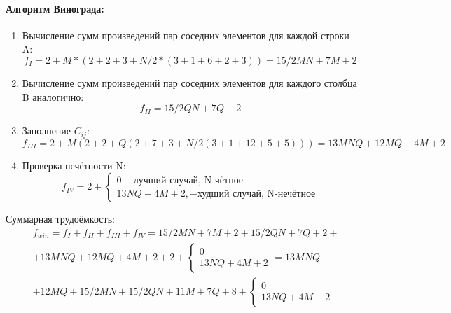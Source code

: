 \paragraph{Алгоритм Винограда:}
\begin{enumerate}[I]
	\item Вычисление сумм произведений пар соседних элементов для каждой строки A:
	\begin{equation}
	f_{I}=2+M*(2+2+3+N/2*(3+1+6+2+3))=15/2MN+7M+2
	\end{equation}
	\item Вычисление сумм произведений пар соседних элементов для каждого столбца B аналогично:
	\begin{equation}
	f_{II}=15/2QN+7Q+2
	\end{equation}
	\item Заполнение $C_{ij}$:
	\begin{equation}
	f_{III}=2+M(2+2+Q(2+7+3+N/2(3+1+12+5+5)))=13MNQ+12MQ+4M+2
	\end{equation}
	\item Проверка нечётности N:
	\begin{equation}
	f_{IV}=2+\begin{cases}
	0-\text{лучший случай, N-чётное}\\
	13NQ+4M+2,-\text{худший случай, N-нечётное}
	\end{cases}
	\end{equation}
\end{enumerate}
Суммарная трудоёмкость:
\begin{equation}
\begin{split}
&f_{win}=f_{I}+f_{II}+f_{III}+f_{IV}=15/2MN+7M+2+15/2QN+7Q+2+\\
&+13MNQ+12MQ+4M+2+2+\begin{cases}0\\13NQ+4M+2\end{cases}=13MNQ+\\
&+12MQ+15/2MN+15/2QN+11M+7Q+8+\begin{cases}0\\13NQ+4M+2\end{cases}
\end{split}
\end{equation}
